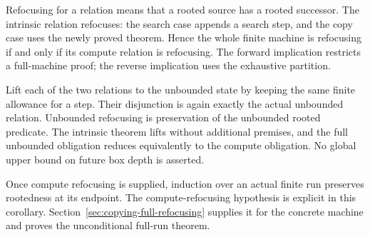 




Refocusing for a relation means that a rooted source has a rooted successor.
The intrinsic relation refocuses: the search case appends a search step, and
the copy case uses the newly proved theorem. Hence the whole finite machine
is refocusing if and only if its compute relation is refocusing. The forward
implication restricts a full-machine proof; the reverse implication uses
the exhaustive partition.




Lift each of the two relations to the unbounded state by keeping the same
finite allowance for a step. Their disjunction is again exactly the actual
unbounded relation. Unbounded refocusing is preservation of the unbounded
rooted predicate. The intrinsic theorem lifts without additional premises,
and the full unbounded obligation reduces equivalently to the compute
obligation. No global upper bound on future box depth is asserted.







Once compute refocusing is supplied, induction over an actual finite run
preserves rootedness at its endpoint. The compute-refocusing hypothesis is explicit in this corollary.
Section~\ref{sec:copying-full-refocusing} supplies it for the concrete machine
and proves the unconditional full-run theorem.

